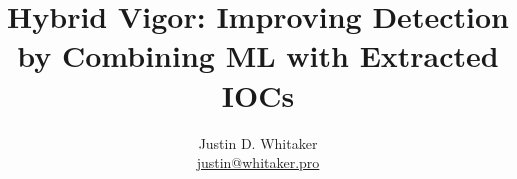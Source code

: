 \documentclass{beamer}
\title{Hybrid Vigor: Improving Detection by \linebreak Combining ML with Extracted IOCs}
\author{Justin D. Whitaker \\ \href{mailto:justin@whitaker.pro}{justin@whitaker.pro} }
\begin{document}
\frame{\titlepage}












\end{document}

